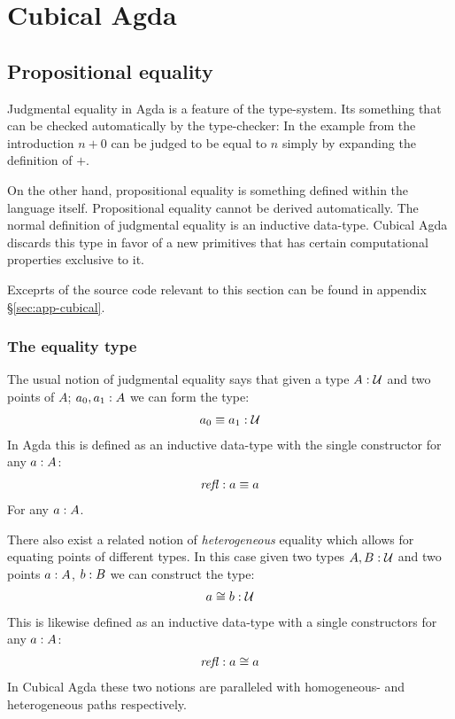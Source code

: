 \chapter{Cubical Agda}
\section{Propositional equality}
Judgmental equality in Agda is a feature of the type-system. Its something that
can be checked automatically by the type-checker: In the example from the
introduction $n + 0$ can be judged to be equal to $n$ simply by expanding the
definition of $+$.

On the other hand, propositional equality is something defined within the
language itself. Propositional equality cannot be derived automatically. The
normal definition of judgmental equality is an inductive data-type. Cubical Agda
discards this type in favor of a new primitives that has certain computational
properties exclusive to it.

Exceprts of the source code relevant to this section can be found in appendix
\S\ref{sec:app-cubical}.

\subsection{The equality type}
The usual notion of judgmental equality says that given a type $A \mathrel{:} \mathcal{U}$ and
two points of $A$; $a_0, a_1 \mathrel{:} A$ we can form the type:
%
\begin{align}
  a_0 \equiv a_1 \mathrel{:} \mathcal{U}
\end{align}
%
In Agda this is defined as an inductive data-type with the single constructor
for any $a \mathrel{:} A$:
%
\begin{align}
  \refl \tp a \equiv a
\end{align}
%
For any $a \mathrel{:} A$.

There also exist a related notion of \emph{heterogeneous} equality which allows
for equating points of different types. In this case given two types $A, B \mathrel{:}
\mathcal{U}$ and two points $a \mathrel{:} A$, $b \mathrel{:} B$ we can construct the type:
%
\begin{align}
  a \cong b \mathrel{:} \mathcal{U}
\end{align}
%
This is likewise defined as an inductive data-type with a single constructors
for any $a \mathrel{:} A$:
%
\begin{align}
  \refl \tp a \cong a
\end{align}
%
In Cubical Agda these two notions are paralleled with homogeneous- and
heterogeneous paths respectively.
%

